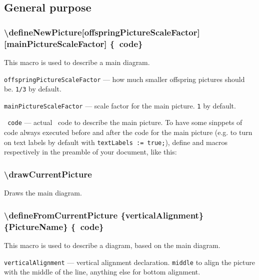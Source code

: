 \documentclass{ltxdoc}
\def\mpPre{textLabels := true;}
\begin{document}
\subsection{General purpose}

\subsubsection{\textbackslash defineNewPicture[offspringPictureScaleFactor] [mainPictureScaleFactor] \{\METAPOST\ code\}}

	This macro is used to describe a main diagram.

	\texttt{offspringPictureScaleFactor} — how much smaller offspring pictures should be. \texttt{1/3} by default.
	
	\texttt{mainPictureScaleFactor} — scale factor for the main picture. \texttt{1} by default.
	
	\texttt{\METAPOST\ code} — actual \METAPOST\ code to describe the main picture. To have some sinppets of code always executed before and after the code for the main picture (e.g. to turn on text labels by default with \texttt{textLabels := true;}), define  and  macros respectively in the preamble of your document, like this:
	
\begin{LaTeXCode}
\def\mpPre{...some MP code...}
\def\mpPost{...some MP code...}
\end{LaTeXCode}


\subsubsection{\textbackslash drawCurrentPicture}
	
	Draws the main diagram.




\subsubsection{\textbackslash defineFromCurrentPicture \{verticalAlignment\} \{PictureName\} \{\METAPOST\ code\}}

	This macro is used to describe a diagram, based on the main diagram.

	\texttt{verticalAlignment} — vertical alignment declaration. \texttt{middle} to align the picture with the middle of the line, anything else for bottom alignment.
\end{document}
